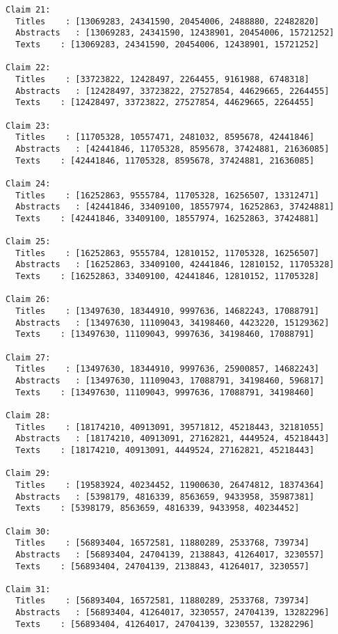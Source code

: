 \documentclass[11pt]{article}
\begin{document}
\begin{Verbatim}[commandchars=\\\{\}]
Claim 21:
  Titles    : [13069283, 24341590, 20454006, 2488880, 22482820]
  Abstracts   : [13069283, 24341590, 12438901, 20454006, 15721252]
  Texts    : [13069283, 24341590, 20454006, 12438901, 15721252]

Claim 22:
  Titles    : [33723822, 12428497, 2264455, 9161988, 6748318]
  Abstracts   : [12428497, 33723822, 27527854, 44629665, 2264455]
  Texts    : [12428497, 33723822, 27527854, 44629665, 2264455]

Claim 23:
  Titles    : [11705328, 10557471, 2481032, 8595678, 42441846]
  Abstracts   : [42441846, 11705328, 8595678, 37424881, 21636085]
  Texts    : [42441846, 11705328, 8595678, 37424881, 21636085]

Claim 24:
  Titles    : [16252863, 9555784, 11705328, 16256507, 13312471]
  Abstracts   : [42441846, 33409100, 18557974, 16252863, 37424881]
  Texts    : [42441846, 33409100, 18557974, 16252863, 37424881]

Claim 25:
  Titles    : [16252863, 9555784, 12810152, 11705328, 16256507]
  Abstracts   : [16252863, 33409100, 42441846, 12810152, 11705328]
  Texts    : [16252863, 33409100, 42441846, 12810152, 11705328]

Claim 26:
  Titles    : [13497630, 18344910, 9997636, 14682243, 17088791]
  Abstracts   : [13497630, 11109043, 34198460, 4423220, 15129362]
  Texts    : [13497630, 11109043, 9997636, 34198460, 17088791]

Claim 27:
  Titles    : [13497630, 18344910, 9997636, 25900857, 14682243]
  Abstracts   : [13497630, 11109043, 17088791, 34198460, 596817]
  Texts    : [13497630, 11109043, 9997636, 17088791, 34198460]

Claim 28:
  Titles    : [18174210, 40913091, 39571812, 45218443, 32181055]
  Abstracts   : [18174210, 40913091, 27162821, 4449524, 45218443]
  Texts    : [18174210, 40913091, 4449524, 27162821, 45218443]

Claim 29:
  Titles    : [19583924, 40234452, 11900630, 26474812, 18374364]
  Abstracts   : [5398179, 4816339, 8563659, 9433958, 35987381]
  Texts    : [5398179, 8563659, 4816339, 9433958, 40234452]

Claim 30:
  Titles    : [56893404, 16572581, 11880289, 2533768, 739734]
  Abstracts   : [56893404, 24704139, 2138843, 41264017, 3230557]
  Texts    : [56893404, 24704139, 2138843, 41264017, 3230557]

Claim 31:
  Titles    : [56893404, 16572581, 11880289, 2533768, 739734]
  Abstracts   : [56893404, 41264017, 3230557, 24704139, 13282296]
  Texts    : [56893404, 41264017, 24704139, 3230557, 13282296]


\end{Verbatim}
\end{document}
